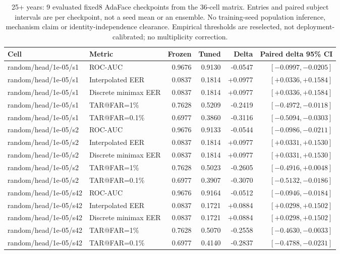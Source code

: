 \begin{table}[!t]
\caption{25+ years: 9 evaluated fixed8 AdaFace checkpoints from the 36-cell matrix. Entries and paired subject intervals are per checkpoint, not a seed mean or an ensemble. No training-seed population inference, mechanism claim or identity-independence clearance. Empirical thresholds are reselected, not deployment-calibrated; no multiplicity correction.}
\label{tab:strong-fixed8-large-gap-25plus}
\centering\scriptsize
\begin{tabular}{@{}llrrrr@{}}
\toprule
Cell & Metric & Frozen & Tuned & Delta & Paired delta 95\% CI \\
\midrule
random/head/1e-05/s1 & ROC-AUC & 0.9676 & 0.9130 & -0.0547 & $[-0.0997,-0.0205]$ \\
random/head/1e-05/s1 & Interpolated EER & 0.0837 & 0.1814 & +0.0977 & $[+0.0336,+0.1584]$ \\
random/head/1e-05/s1 & Discrete minimax EER & 0.0837 & 0.1814 & +0.0977 & $[+0.0336,+0.1584]$ \\
random/head/1e-05/s1 & TAR@FAR=1\% & 0.7628 & 0.5209 & -0.2419 & $[-0.4972,-0.0118]$ \\
random/head/1e-05/s1 & TAR@FAR=0.1\% & 0.6977 & 0.3860 & -0.3116 & $[-0.5094,-0.0303]$ \\
random/head/1e-05/s2 & ROC-AUC & 0.9676 & 0.9133 & -0.0544 & $[-0.0986,-0.0211]$ \\
random/head/1e-05/s2 & Interpolated EER & 0.0837 & 0.1814 & +0.0977 & $[+0.0331,+0.1530]$ \\
random/head/1e-05/s2 & Discrete minimax EER & 0.0837 & 0.1814 & +0.0977 & $[+0.0331,+0.1530]$ \\
random/head/1e-05/s2 & TAR@FAR=1\% & 0.7628 & 0.5023 & -0.2605 & $[-0.4916,+0.0048]$ \\
random/head/1e-05/s2 & TAR@FAR=0.1\% & 0.6977 & 0.3907 & -0.3070 & $[-0.5132,-0.0186]$ \\
random/head/1e-05/s42 & ROC-AUC & 0.9676 & 0.9164 & -0.0512 & $[-0.0946,-0.0184]$ \\
random/head/1e-05/s42 & Interpolated EER & 0.0837 & 0.1721 & +0.0884 & $[+0.0298,+0.1502]$ \\
random/head/1e-05/s42 & Discrete minimax EER & 0.0837 & 0.1721 & +0.0884 & $[+0.0298,+0.1502]$ \\
random/head/1e-05/s42 & TAR@FAR=1\% & 0.7628 & 0.5070 & -0.2558 & $[-0.4630,-0.0033]$ \\
random/head/1e-05/s42 & TAR@FAR=0.1\% & 0.6977 & 0.4140 & -0.2837 & $[-0.4788,-0.0231]$ \\

\end{tabular}
\end{table}
